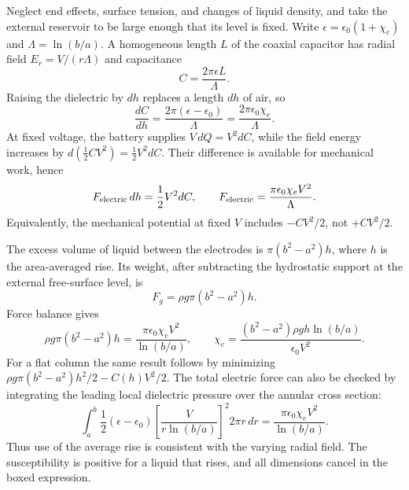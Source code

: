 Neglect end effects, surface tension, and changes of liquid density,
and take the external reservoir to be large enough that its level is
fixed. Write $\epsilon=\epsilon_0(1+\chi_e)$ and
$\Lambda=\ln(b/a)$. A homogeneous length $L$ of the coaxial capacitor
has radial field $E_r=V/(r\Lambda)$ and capacitance
\[
C=\frac{2\pi\epsilon L}{\Lambda}.
\]
Raising the dielectric by $dh$ replaces a length $dh$ of air, so
\[
\frac{dC}{dh}=\frac{2\pi(\epsilon-\epsilon_0)}{\Lambda}
=\frac{2\pi\epsilon_0\chi_e}{\Lambda}.
\]
At fixed voltage, the battery supplies $V\,dQ=V^2dC$, while the
field energy increases by $d(\tfrac12CV^2)=\tfrac12V^2dC$.
Their difference is available for mechanical work, hence
\[
F_{\rm electric}\,dh=\frac12V^2dC,\qquad
F_{\rm electric}=\frac{\pi\epsilon_0\chi_e V^2}{\Lambda}.
\]
Equivalently, the mechanical potential at fixed $V$ includes
$-CV^2/2$, not $+CV^2/2$.

The excess volume of liquid between the electrodes is
$\pi(b^2-a^2)h$, where $h$ is the area-averaged rise. Its weight,
after subtracting the hydrostatic support at the external free-surface
level, is
\[
F_g=\rho g\pi(b^2-a^2)h.
\]
Force balance gives
\[
\rho g\pi(b^2-a^2)h
=\frac{\pi\epsilon_0\chi_e V^2}{\ln(b/a)},\qquad
\boxed{\chi_e=\frac{(b^2-a^2)\rho gh\ln(b/a)}{\epsilon_0V^2}.}
\]
For a flat column the same result follows by minimizing
$\rho g\pi(b^2-a^2)h^2/2-C(h)V^2/2$.
The total electric force can also be checked by integrating the
leading local dielectric pressure over the annular cross section:
\[
\int_a^b\frac12(\epsilon-\epsilon_0)
\left[\frac{V}{r\ln(b/a)}\right]^2 2\pi r\,dr
=\frac{\pi\epsilon_0\chi_e V^2}{\ln(b/a)}.
\]
Thus use of the average rise is consistent with the varying radial
field. The susceptibility is positive for a liquid that rises, and
all dimensions cancel in the boxed expression.
